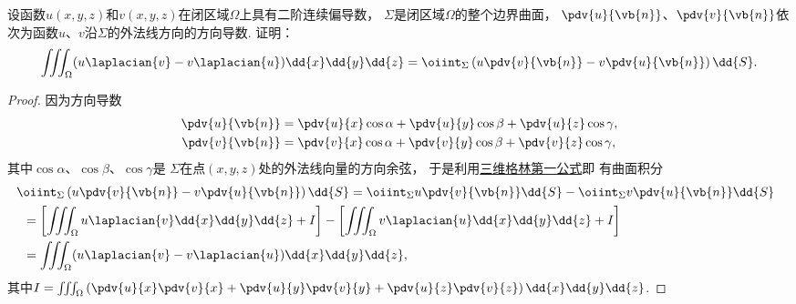 \begin{example}[三维格林第二公式]
设函数\(u(x,y,z)\)和\(v(x,y,z)\)在闭区域\(\Omega\)上具有二阶连续偏导数，
\(\Sigma\)是闭区域\(\Omega\)的整个边界曲面，
\(\pdv{u}{\vb{n}}\)、\(\pdv{v}{\vb{n}}\)依次为函数\(u\)、\(v\)沿\(\Sigma\)的外法线方向的方向导数.
证明：
\begin{equation}\label{equation:线积分与面积分.三维格林第二公式}
	\iiint_\Omega (u \laplacian{v} - v \laplacian{u}) \dd{x}\dd{y}\dd{z}
	=\oiint_\Sigma \left( u \pdv{v}{\vb{n}} - v \pdv{u}{\vb{n}} \right) \dd{S}.
\end{equation}
\begin{proof}
\def\Io{\iiint_\Omega \left(%
	\pdv{u}{x} \pdv{v}{x}%
	+\pdv{u}{y} \pdv{v}{y}%
	+\pdv{u}{z} \pdv{v}{z}%
\right) \dd{x}\dd{y}\dd{z}}%
因为方向导数\begin{align*}
	\pdv{u}{\vb{n}}
	&= \pdv{u}{x} \cos\alpha
	+ \pdv{u}{y} \cos\beta
	+ \pdv{u}{z} \cos\gamma, \\
	\pdv{v}{\vb{n}}
	&= \pdv{v}{x} \cos\alpha
	+ \pdv{v}{y} \cos\beta
	+ \pdv{v}{z} \cos\gamma,
\end{align*}
其中\(\cos\alpha\)、\(\cos\beta\)、\(\cos\gamma\)是
\(\Sigma\)在点\((x,y,z)\)处的外法线向量的方向余弦，
于是利用\hyperref[equation:线积分与面积分.三维格林第一公式]{三维格林第一公式}即
有曲面积分\begin{align*}
	&\hspace{-5pt}
	\oiint_\Sigma \left( u \pdv{v}{\vb{n}} - v \pdv{u}{\vb{n}} \right) \dd{S}
	= \oiint_\Sigma u \pdv{v}{\vb{n}} \dd{S}
		- \oiint_\Sigma v \pdv{u}{\vb{n}} \dd{S} \\
	&= \left[ \iiint_\Omega u \laplacian{v} \dd{x}\dd{y}\dd{z} + I \right]
		- \left[ \iiint_\Omega v \laplacian{u} \dd{x}\dd{y}\dd{z} + I \right] \\
	&= \iiint_\Omega (u \laplacian{v} - v \laplacian{u}) \dd{x}\dd{y}\dd{z},
\end{align*}
其中\(I = \Io\).
\end{proof}
\end{example}

